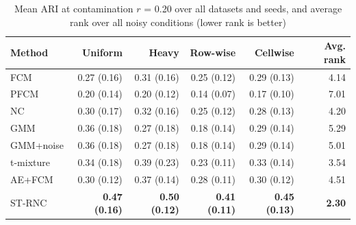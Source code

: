 \begin{table}[t]
\centering
\scriptsize
\setlength{\tabcolsep}{3pt}
\caption{Mean ARI at contamination $r$ = 0.20 over all datasets and seeds, and average rank over all noisy conditions (lower rank is better)}
\label{tab:ari}
\begin{tabular}{lrrrrr}
\toprule
Method & Uniform & Heavy & Row-wise & Cellwise & Avg. rank \\
\midrule
FCM & 0.27 (0.16) & 0.31 (0.16) & 0.25 (0.12) & 0.29 (0.13) & 4.14 \\
PFCM & 0.20 (0.14) & 0.20 (0.12) & 0.14 (0.07) & 0.17 (0.10) & 7.01 \\
NC & 0.30 (0.17) & 0.32 (0.16) & 0.25 (0.12) & 0.28 (0.13) & 4.20 \\
GMM & 0.36 (0.18) & 0.27 (0.18) & 0.18 (0.14) & 0.29 (0.14) & 5.29 \\
GMM+noise & 0.36 (0.18) & 0.27 (0.18) & 0.18 (0.14) & 0.29 (0.14) & 5.01 \\
t-mixture & 0.34 (0.18) & 0.39 (0.23) & 0.23 (0.11) & 0.33 (0.14) & 3.54 \\
AE+FCM & 0.30 (0.12) & 0.37 (0.14) & 0.28 (0.11) & 0.30 (0.12) & 4.51 \\
ST-RNC & \textbf{0.47 (0.16)} & \textbf{0.50 (0.12)} & \textbf{0.41 (0.11)} & \textbf{0.45 (0.13)} & \textbf{2.30} \\
\bottomrule
\end{tabular}
\end{table}
